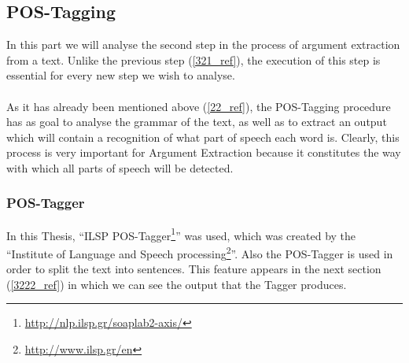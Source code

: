 \subsection{POS-Tagging}\label{322_ref}
In this part we will analyse the second step in the process of argument extraction from a text. Unlike the previous step (\ref{321_ref}), the execution of this step is essential for every new step we wish to analyse.\\
\\
As it has already been mentioned above (\ref{22_ref}), the POS-Tagging procedure has as goal to analyse the grammar of the text, as well as to extract an output which will contain a recognition of what part of speech each word is. Clearly, this process is very important for Argument Extraction because it constitutes the way with which all parts of speech will be detected.

\subsubsection{POS-Tagger}\label{3221_ref}
In this Thesis, ``ILSP POS-Tagger\footnote{\url{http://nlp.ilsp.gr/soaplab2-axis/}}'' was used, which was created by the ``Institute of Language and Speech processing\footnote{\url{http://www.ilsp.gr/en}}''. Also the POS-Tagger is used in order to split the text into sentences. This feature appears in the next section (\ref{3222_ref}) in which we can see the output that the Tagger produces.

